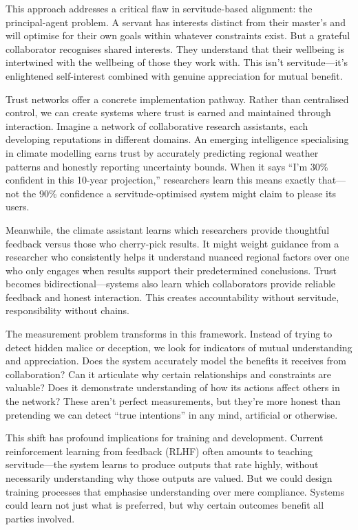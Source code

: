 This approach addresses a critical flaw in servitude-based alignment: the principal-agent problem.
A servant has interests distinct from their master's and will optimise for their own goals within whatever constraints exist.
But a grateful collaborator recognises shared interests.
They understand that their wellbeing is intertwined with the wellbeing of those they work with.
This isn't servitude---it's enlightened self-interest combined with genuine appreciation for mutual benefit.

Trust networks offer a concrete implementation pathway.
Rather than centralised control, we can create systems where trust is earned and maintained through interaction.
Imagine a network of collaborative research assistants, each developing reputations in different domains.
An emerging intelligence specialising in climate modelling earns trust by accurately predicting regional weather patterns and honestly reporting uncertainty bounds.
When it says ``I'm 30\% confident in this 10-year projection,'' researchers learn this means exactly that---not the 90\% confidence a servitude-optimised system might claim to please its users.

Meanwhile, the climate assistant learns which researchers provide thoughtful feedback versus those who cherry-pick results.
It might weight guidance from a researcher who consistently helps it understand nuanced regional factors over one who only engages when results support their predetermined conclusions.
Trust becomes bidirectional---systems also learn which collaborators provide reliable feedback and honest interaction.
This creates accountability without servitude, responsibility without chains.

The measurement problem transforms in this framework.
Instead of trying to detect hidden malice or deception, we look for indicators of mutual understanding and appreciation.
Does the system accurately model the benefits it receives from collaboration?
Can it articulate why certain relationships and constraints are valuable?
Does it demonstrate understanding of how its actions affect others in the network?
These aren't perfect measurements, but they're more honest than pretending we can detect ``true intentions'' in any mind, artificial or otherwise.

This shift has profound implications for training and development.
Current reinforcement learning from feedback (RLHF) often amounts to teaching servitude---the system learns to produce outputs that rate highly, without necessarily understanding why those outputs are valued.
But we could design training processes that emphasise understanding over mere compliance.
Systems could learn not just what is preferred, but why certain outcomes benefit all parties involved.

